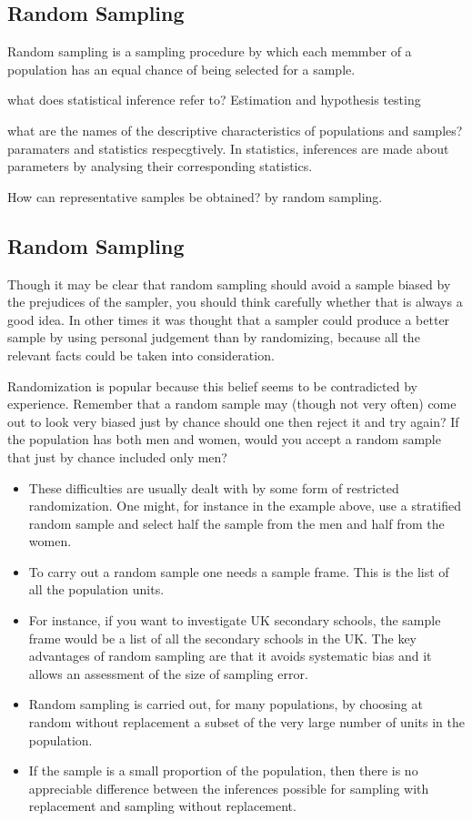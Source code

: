 ﻿\documentclass[]{report}
\begin{document}
\subsection{Random Sampling}
Random sampling is a sampling procedure by which each memmber of a population has an equal chance of being selected for a sample.

what does statistical inference refer to? Estimation and hypothesis testing

what are the names of the descriptive characteristics of populations and samples? paramaters and statistics respecgtively. In statistics, inferences are made about parameters by analysing their corresponding statistics.

How can representative samples be obtained? by random sampling.

\subsection{Random Sampling}
Though it may be clear that random sampling should avoid a sample biased
by the prejudices of the sampler, you should think carefully whether that is always a good idea.
In other times it was thought that a sampler could produce a better sample by using personal
judgement than by randomizing, because all the relevant facts could be taken into consideration.

Randomization is popular because this belief seems to be contradicted by experience. Remember
that a random sample may (though not very often) come out to look very biased just by chance
should one then reject it and try again? If the population has both men and women, would you
accept a random sample that just by chance included only men? 
\begin{itemize}
\item These difficulties are usually dealt
with by some form of restricted randomization. One might, for instance in the example above, use
a stratified random sample and select half the sample from the men and half from the women.
\item  To
carry out a random sample one needs a sample frame. This is the list of all the population units.
\item For instance, if you want to investigate UK secondary schools, the sample frame would be a list
of all the secondary schools in the UK. The key advantages of random sampling are that it avoids
systematic bias and it allows an assessment of the size of sampling error.

\item Random sampling is carried out, for many populations, by choosing at random without replacement
a subset of the very large number of units in the population. 
\item If the sample is a small proportion of
the population, then there is no appreciable difference between the inferences possible for sampling
with replacement and sampling without replacement.

\end{itemize}
\end{document}
